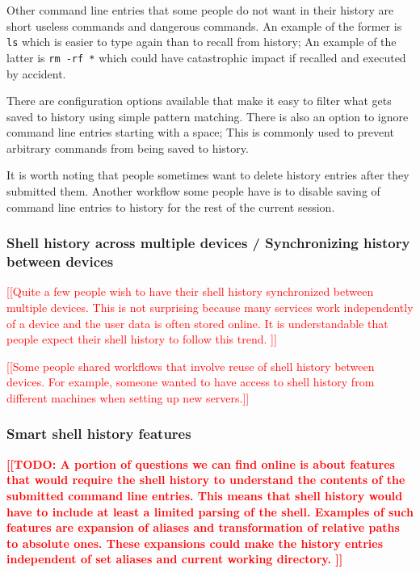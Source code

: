 \documentclass[thesis=M,english]{FITthesis}[2012/10/20]
\newcommand{\todotext}[1]{\textcolor{red}{\textbf{[[#1]]}}}
\newcommand{\redtext}[1]{\textcolor{red}{[[#1]]}}
\begin{document}
Other command line entries that some people do not want in their history are short useless commands and dangerous commands. An example of the former is \verb|ls| which is easier to type again than to recall from history; An example of the latter is \verb|rm -rf *| which could have catastrophic impact if recalled and executed by accident.

There are configuration options available that make it easy to filter what gets saved to history using simple pattern matching. There is also an option to ignore command line entries starting with a space; This is commonly used to prevent arbitrary commands from being saved to history.

It is worth noting that people sometimes want to delete history entries after they submitted them. Another workflow some people have is to disable saving of command line entries to history for the rest of the current session.

\subsubsection*{Shell history across multiple devices / Synchronizing history between devices}

\redtext{Quite a few people wish to have their shell history synchronized between multiple devices. This is not surprising because many services work independently of a device and the user data is often stored online. It is understandable that people expect their shell history to follow this trend.  }

\redtext{Some people shared workflows that involve reuse of shell history between devices. For example, someone wanted to have access to shell history from different machines when setting up new servers.}

\subsubsection*{Smart shell history features}

\todotext{TODO: A portion of questions we can find online is about features that would require the shell history to understand the contents of the submitted command line entries. This means that shell history would have to include at least a limited parsing of the shell. Examples of such features are expansion of aliases and transformation of relative paths to absolute ones. These expansions could make the history entries independent of set aliases and current working directory. }
\end{document}
